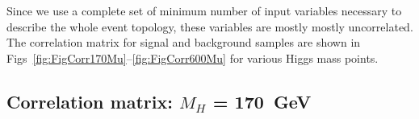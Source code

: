 Since we use a complete set of minimum number of 
input variables necessary to describe the whole event topology, 
these variables are mostly mostly uncorrelated. 
The correlation matrix for signal and background 
samples are shown in Figs~\ref{fig:FigCorr170Mu}--\ref{fig:FigCorr600Mu}
for various Higgs mass points.
\subsection{Correlation matrix: \texorpdfstring{$M_H$}{M(H)} = 170~GeV}
\begin{figure}[bthp!]
\vspace*{1mm} \\
\end{figure}
